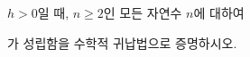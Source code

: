 $h>0$일 때, $n\ge 2$인 모든 자연수 $n$에 대하여 \par\smallskip{}\par\smallskip\noindent 가 성립함을 수학적 귀납법으로 증명하시오.
